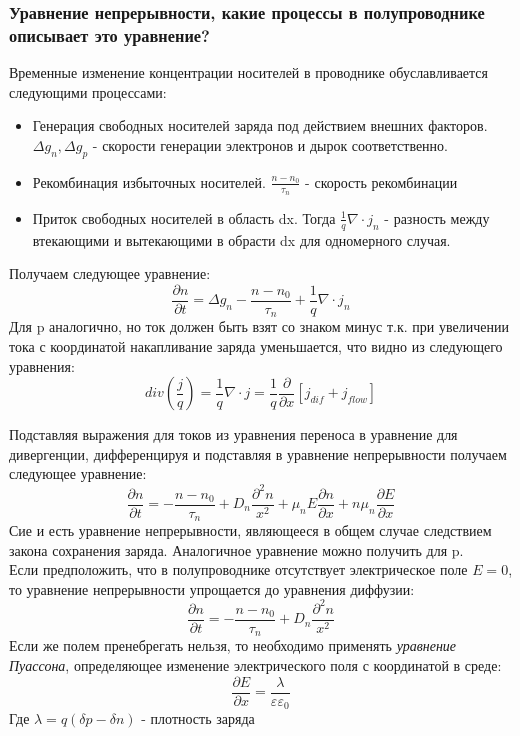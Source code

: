 \subsubsection{Уравнение непрерывности, какие процессы в полупроводнике описывает это уравнение?}
Временные изменение концентрации носителей в проводнике обуславливается следующими процессами:
\begin{itemize}
\item Генерация свободных носителей заряда под действием внешних факторов. $\Delta g_n , \Delta g_p$ - скорости генерации электронов и дырок соответственно.
\item Рекомбинация избыточных носителей. $\frac{n - n_0}{\tau_n}$ - скорость рекомбинации
\item Приток свободных носителей в область dx. Тогда $\frac{1}{q}\nabla \cdot j_{n}$ - разность между втекающими и вытекающими в обрасти dx для одномерного случая.
\end{itemize}

Получаем следующее уравнение:
\begin{equation}
\frac{\partial n}{ \partial t} = \Delta g_n - \frac{n - n_0}{\tau_n} + \frac{1}{q} \nabla \cdot j_{n}
\end{equation}
Для p аналогично, но ток должен быть взят со знаком минус т.к. при увеличении тока с координатой накапливание заряда уменьшается, что видно из следующего уравнения:
\begin{equation}
div(\frac{j}{q}) = \frac{1}{q} \nabla \cdot j = \frac{1}{q}\frac{\partial}{ \partial x} \left[ j_{dif} + j_{flow} \right]
\end{equation}

Подставляя выражения для токов из уравнения переноса в уравнение для дивергенции, дифференцируя и подставляя в уравнение непрерывности получаем следующее уравнение:
\begin{equation}
\frac{\partial n}{ \partial t} = -  \frac{n - n_0}{\tau_n}  + D_n \frac{\partial^2 n }{x^2} + \mu_n E \frac{\partial n}{\partial x} + n \mu_n \frac{\partial E}{\partial x}
\end{equation}
Сие и есть уравнение непрерывности, являющееся в общем случае следствием закона сохранения заряда. Аналогичное уравнение можно получить для p.\\

Если предположить, что в полупроводнике отсутствует электрическое поле $E=0$, то уравнение непрерывности упрощается до уравнения диффузии:
\begin{equation}
\frac{\partial n}{ \partial t} = -  \frac{n - n_0}{\tau_n}  + D_n \frac{\partial^2 n }{x^2}
\end{equation}
Если же полем пренебрегать нельзя, то необходимо применять\textit{ уравнение Пуассона}, определяющее изменение электрического поля с координатой в среде:
\begin{equation}
\frac{\partial E}{\partial x} = \frac{\lambda}{\varepsilon \varepsilon_0}
\end{equation}
Где $\lambda = q (\delta p - \delta n)$ - плотность заряда



\pagebreak
